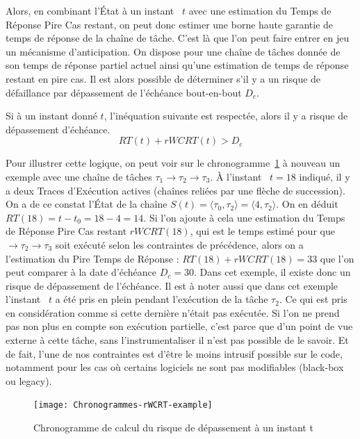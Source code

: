 \documentclass[french, a4paper, 11pt, twoside, pdftex]{StyleThese}
\begin{document}
    Alors, en combinant l'État à un instant ~$t$ avec une estimation du Temps de Réponse Pire Cas restant, on peut donc estimer une borne haute garantie de temps de réponse de la chaîne de tâche. C'est là que l'on peut faire entrer en jeu un mécanisme d'anticipation. 
    On dispose pour une chaîne de tâches donnée de son temps de réponse partiel actuel ainsi qu'une estimation de temps de réponse restant en pire cas. Il est alors possible de déterminer s'il y a un risque de défaillance par dépassement de l'échéance bout-en-bout $D_c$.
    \begin{theorem}
    	Si à un instant donné $t$, l'inéquation suivante est respectée, alors il y a risque de dépassement d'échéance.
    	\begin{equation*} 
    		RT(t) + rWCRT(t) > D_c
    	\end{equation*}
    \end{theorem}

	Pour illustrer cette logique, on peut voir sur le chronogramme~\ref{fig:chronogram_rWCRT_example} à nouveau un exemple avec une chaîne de tâches $\tau_1 \rightarrow \tau_2 \rightarrow \tau_3$. À l'instant ~$t=18$ indiqué, il y a deux Traces d'Exécution actives (chaînes reliées par une flèche de succession). On a de ce constat l'État de la chaîne $S(t) = \langle \tau_0, \tau_2\rangle = \langle 4, \tau_{2} \rangle $.
	On en déduit $ RT(18) = t - t_0 = 18-4 = 14 $. Si l'on ajoute à cela une estimation du Temps de Réponse Pire Cas restant $rWCRT(18)$, qui est le temps estimé pour que $\rightarrow \tau_2 \rightarrow \tau_3$ soit exécuté selon les contraintes de précédence, alors on a l'estimation du Pire Temps de Réponse : $ RT(18) + rWCRT(18) = 33$ que l'on peut comparer à la date d'échéance $ D_c = 30 $. Dans cet exemple, il existe donc un risque de dépassement de l'échéance.
	Il est à noter aussi que dans cet exemple l'instant ~$t$ a été pris en plein pendant l'exécution de la tâche $ \tau_2 $. Ce qui est pris en considération comme si cette dernière n'était pas exécutée. Si l'on ne prend pas non plus en compte son exécution partielle, c'est parce que d'un point de vue externe à cette tâche, sans l'instrumentaliser il n'est pas possible de le savoir. Et de fait, l'une de nos contraintes est d'être le moins intrusif possible sur le code, notamment pour les cas où certains logiciels ne sont pas modifiables (black-box ou legacy). 
	
	\begin{figure}[ht]
		\centering 
		\texttt{[image: Chronogrammes-rWCRT-example]}
		\caption{Chronogramme de calcul du risque de dépassement à un instant t}
		\label{fig:chronogram_rWCRT_example}
	\end{figure}
\end{document}
